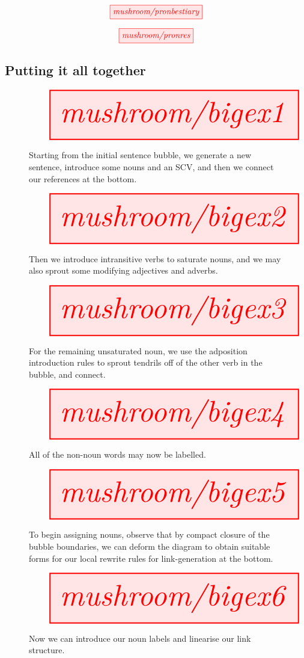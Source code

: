 
\[
\tikzfig{mushroom/pronbestiary}
\]

\[
\tikzfig{mushroom/pronres}
\]


\newpage
\subsection{Putting it all together}

\begin{figure}[h!]
\centering
\[
\resizebox{\textwidth}{!}{\tikzfig{mushroom/bigex1}}
\]
\caption{Starting from the initial sentence bubble, we generate a new sentence, introduce some nouns and an SCV, and then we connect our references at the bottom.}
\end{figure}

\begin{figure}[h!]
\centering
\[
\resizebox{\textwidth}{!}{\tikzfig{mushroom/bigex2}}
\]
\caption{Then we introduce intransitive verbs to saturate nouns, and we may also sprout some modifying adjectives and adverbs.}
\end{figure}

\begin{figure}[h!]
\centering
\[
\resizebox{\textwidth}{!}{\tikzfig{mushroom/bigex3}}
\]
\caption{For the remaining unsaturated noun, we use the adposition introduction rules to sprout tendrils off of the other verb in the bubble, and connect.}
\end{figure}

\begin{figure}[h!]
\centering
\[
\resizebox{\textwidth}{!}{\tikzfig{mushroom/bigex4}}
\]
\caption{All of the non-noun words may now be labelled.}
\end{figure}

\begin{figure}[h!]
\centering
\[
\resizebox{\textwidth}{!}{\tikzfig{mushroom/bigex5}}
\]
\caption{To begin assigning nouns, observe that by compact closure of the bubble boundaries, we can deform the diagram to obtain suitable forms for our local rewrite rules for link-generation at the bottom.}
\end{figure}

\begin{figure}[h!]
\centering
\[
\resizebox{\textwidth}{!}{\tikzfig{mushroom/bigex6}}
\]
\caption{Now we can introduce our noun labels and linearise our link structure.}
\end{figure}

